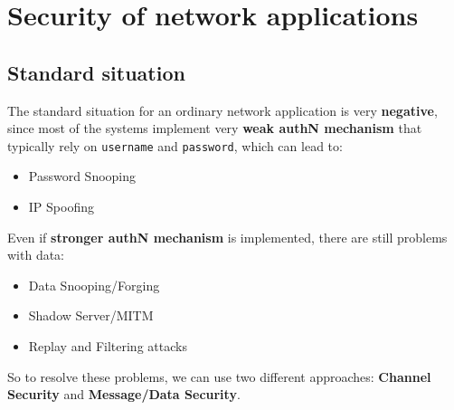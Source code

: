 \chapter{Security of network applications}
\section{Standard situation}
The standard situation for an ordinary network application is very \textbf{negative}, since most of the systems implement very \textbf{weak authN mechanism} that typically rely on \texttt{username} and \texttt{password}, which can lead to:
\begin{itemize}
    \item Password Snooping
    \item IP Spoofing 
\end{itemize}
Even if \textbf{stronger authN mechanism} is implemented, there are still problems with data:
\begin{itemize}
    \item Data Snooping/Forging
    \item Shadow Server/MITM
    \item Replay and Filtering attacks
\end{itemize}
So to resolve these problems, we can use two different approaches: \textbf{Channel Security} and \textbf{Message/Data Security}.

